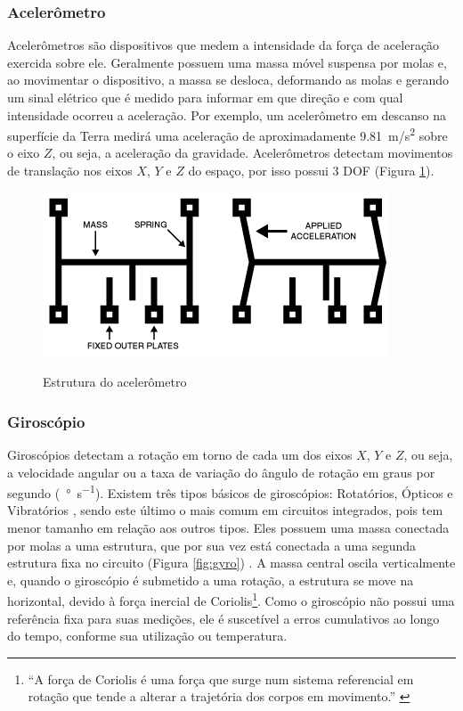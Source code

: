 \subsubsection{Acelerômetro}
\label{subsubsec:accel}
Acelerômetros são dispositivos que medem a intensidade da força de aceleração exercida sobre ele. Geralmente possuem uma massa móvel suspensa por molas e, ao movimentar o dispositivo, a massa se desloca, deformando as molas e gerando um sinal elétrico que é medido para informar em que direção e com qual intensidade ocorreu a aceleração. Por exemplo, um acelerômetro em descanso na superfície da Terra medirá uma aceleração de aproximadamente \SI{9.81}{m/s^{2}} sobre o eixo $Z$, ou seja, a aceleração da gravidade. Acelerômetros detectam movimentos de translação nos eixos $X$, $Y$ e $Z$ do espaço, por isso possui 3 \ac{DOF} (Figura \ref{fig:accel}).

\begin{figure}[H]
  \setlength{\abovecaptionskip}{0pt}
  \setlength{\belowcaptionskip}{0pt}
  \caption[Estrutura do acelerômetro]{Estrutura do acelerômetro}
  \centering
  \includegraphics[width=.4\textwidth]{imagem/accel}
  \captionsetup{justification=centering}
  \label{fig:accel}
\end{figure}

\subsubsection{Giroscópio}
\label{subsubsec:gyro}
Giroscópios detectam a rotação em torno de cada um dos eixos $X$, $Y$ e $Z$, ou seja, a velocidade angular ou a taxa de variação do ângulo de rotação em graus por segundo (\SI[per-mode=symbol]{}{\degree\per\second}). Existem três tipos básicos de giroscópios: Rotatórios, Ópticos e Vibratórios \cite{fraden2004handbook}, sendo este último o mais comum em circuitos integrados, pois tem menor tamanho em relação aos outros tipos. Eles possuem uma massa conectada por molas a uma estrutura, que por sua vez está conectada a uma segunda estrutura fixa no circuito (Figura \ref{fig:gyro}) . A massa central oscila verticalmente e, quando o giroscópio é submetido a uma rotação, a estrutura se move na horizontal, devido à força inercial de Coriolis\footnote{``A força de Coriolis é uma força que surge num sistema referencial em rotação que tende a alterar a trajetória dos corpos em movimento.'' \cite{coriolis}}. Como o giroscópio não possui uma referência fixa para suas medições, ele é suscetível a erros cumulativos ao longo do tempo, conforme sua utilização ou temperatura.

